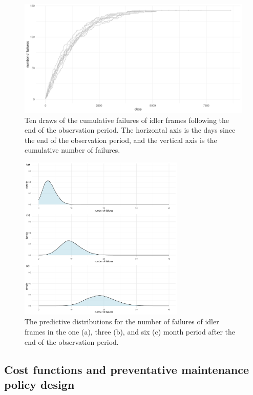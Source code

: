 \begin{figure}
  \centering
  \includegraphics[width=1\textwidth]{./figures/ch-3/E-n-failures-draws.pdf}
  \caption{Ten draws of the cumulative failures of idler frames following the end of the observation period. The horizontal axis is the days since the end of the observation period, and the vertical axis is the cumulative number of failures.}
  \label{fig:E-Nfailrues-draws}
\end{figure}

\begin{figure}
  \centering
  \includegraphics[width=0.7\textwidth]{./figures/ch-3/E-n-failures-densities.pdf}
  \caption{The predictive distributions for the number of failures of idler frames in the one (a), three (b), and six (c) month period after the end of the observation period.}
  \label{fig:E-Nfailrues-densities}
\end{figure}

\subsection{Cost functions and preventative maintenance policy design} \label{subsec:idler-cost-function}

